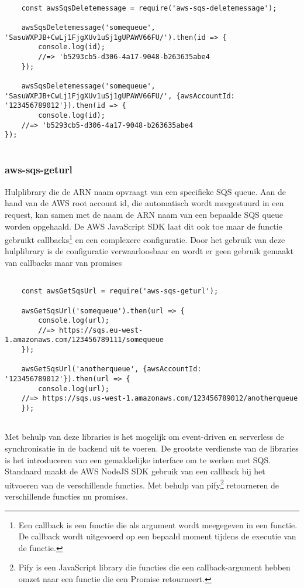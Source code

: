 \begin{lstlisting}[caption=Voorbeeld hoe een bericht wordt verwijderd van SQS nadat het is verwerkt]

	const awsSqsDeletemessage = require('aws-sqs-deletemessage');

	awsSqsDeletemessage('somequeue', 'SasuWXPJB+CwLj1FjgXUv1uSj1gUPAWV66FU/').then(id => {
		console.log(id);
		//=> 'b5293cb5-d306-4a17-9048-b263635abe4
	});

	awsSqsDeletemessage('somequeue', 'SasuWXPJB+CwLj1FjgXUv1uSj1gUPAWV66FU/', {awsAccountId: '123456789012'}).then(id => {
		console.log(id);
	//=> 'b5293cb5-d306-4a17-9048-b263635abe4
});
	
\end{lstlisting}

\subsubsection{aws-sqs-geturl}
Hulplibrary die de ARN naam opvraagt van een specifieke SQS queue. Aan de hand van de AWS root account id, die automatisch wordt meegestuurd in een request, kan samen met de naam de ARN naam van een bepaalde SQS queue worden opgehaald. De AWS JavaScript SDK laat dit ook toe maar de functie gebruikt callbacks\footnote{Een callback is een functie die als argument wordt meegegeven in een functie. De callback wordt uitgevoerd op een bepaald moment tijdens de executie van de functie.}  en een complexere configuratie. Door het gebruik van deze hulplibrary is de configuratie verwaarloosbaar en wordt er geen gebruik gemaakt van callbacks maar van promises

\begin{lstlisting}[caption=Voorbeeld hoe de ARN van een SQS wordt opgehaald]

	const awsGetSqsUrl = require('aws-sqs-geturl');

	awsGetSqsUrl('somequeue').then(url => {
		console.log(url);
		//=> https://sqs.eu-west-1.amazonaws.com/123456789111/somequeue
	});

	awsGetSqsUrl('anotherqueue', {awsAccountId: '123456789012'}).then(url => {
		console.log(url);
	//=> https://sqs.us-west-1.amazonaws.com/123456789012/anotherqueue
	});
	
\end{lstlisting}

Met behulp van deze libraries is het mogelijk om event-driven en serverless de synchronisatie in de backend uit te voeren. De grootste verdienste van de libraries is het introduceren van een gemakkelijke interface om te werken met SQS. Standaard maakt de AWS NodeJS SDK gebruik van een callback bij het uitvoeren van de verschillende functies. Met behulp van pify\footnote{Pify is een JavaScript library die functies die een callback-argument hebben omzet naar een functie die een Promise retourneert.} retourneren de verschillende functies nu promises.
